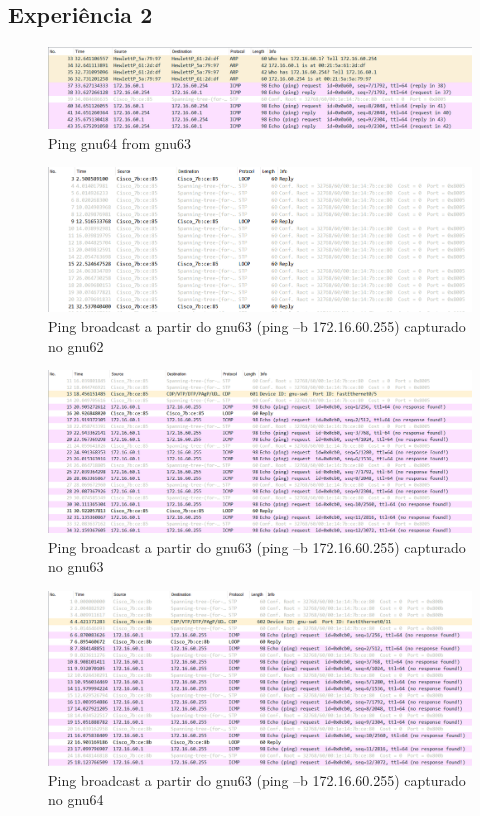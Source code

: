 \documentclass[article, a4paper, 11pt, oneside]{memoir}
\begin{document}
\subsection{Experiência 2}
\begin{figure}[h]
	\centering
\includegraphics[scale=0.45]{exp2-step5-ping-gnu64-from-gnu63.png}
\caption{Ping gnu64 from gnu63}
\end{figure}

\newpage
\begin{figure}[h]
	\centering
\includegraphics[scale=0.50]{exp2-step8-broadcast-gnu63-from-gnu62.png}
\caption{Ping broadcast a partir do gnu63 (ping –b 172.16.60.255) capturado no gnu62}
\end{figure}


\begin{figure}[h]
	\centering
\includegraphics[scale=0.45]{exp2-step8-broadcast-gnu63-from-gnu63.png}
\caption{Ping broadcast a partir do gnu63 (ping –b 172.16.60.255) capturado no gnu63}
\end{figure}

\begin{figure}[h]
	\centering
\includegraphics[scale=0.45]{exp2-step8-broadcast-gnu63-from-gnu64.png}
\caption{Ping broadcast a partir do gnu63 (ping –b 172.16.60.255) capturado no gnu64}
\end{figure}
\end{document}
